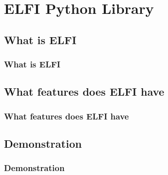 \documentclass{beamer}
\begin{document}

\section{ELFI Python Library}

\subsection{What is ELFI}

\begin{frame}
\frametitle{What is ELFI}
\end{frame}

\subsection{What features does ELFI have}

\begin{frame}
\frametitle{What features does ELFI have}
\end{frame}

\subsection{Demonstration}

\begin{frame}
\frametitle{Demonstration}
\end{frame}
\end{document}
